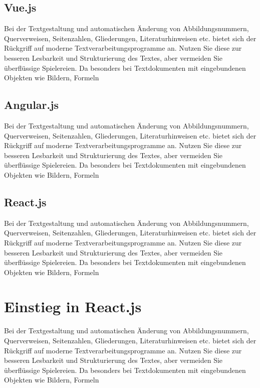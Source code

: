\subsection{Vue.js}
Bei der Textgestaltung und automatischen Änderung von Abbildungsnummern, Querverweisen,
Seitenzahlen, Gliederungen, Literaturhinweisen etc. bietet sich der Rückgriff
auf moderne Textverarbeitungsprogramme an. Nutzen Sie diese zur besseren Lesbarkeit
und Strukturierung des Textes, aber vermeiden Sie überflüssige Spielereien. Da
besonders bei Textdokumenten mit eingebundenen Objekten wie Bildern, Formeln

\subsection{Angular.js}
Bei der Textgestaltung und automatischen Änderung von Abbildungsnummern, Querverweisen,
Seitenzahlen, Gliederungen, Literaturhinweisen etc. bietet sich der Rückgriff
auf moderne Textverarbeitungsprogramme an. Nutzen Sie diese zur besseren Lesbarkeit
und Strukturierung des Textes, aber vermeiden Sie überflüssige Spielereien. Da
besonders bei Textdokumenten mit eingebundenen Objekten wie Bildern, Formeln

\subsection{React.js}
Bei der Textgestaltung und automatischen Änderung von Abbildungsnummern, Querverweisen,
Seitenzahlen, Gliederungen, Literaturhinweisen etc. bietet sich der Rückgriff
auf moderne Textverarbeitungsprogramme an. Nutzen Sie diese zur besseren Lesbarkeit
und Strukturierung des Textes, aber vermeiden Sie überflüssige Spielereien. Da
besonders bei Textdokumenten mit eingebundenen Objekten wie Bildern, Formeln

\section{Einstieg in React.js}
Bei der Textgestaltung und automatischen Änderung von Abbildungsnummern, Querverweisen,
Seitenzahlen, Gliederungen, Literaturhinweisen etc. bietet sich der Rückgriff
auf moderne Textverarbeitungsprogramme an. Nutzen Sie diese zur besseren Lesbarkeit
und Strukturierung des Textes, aber vermeiden Sie überflüssige Spielereien. Da
besonders bei Textdokumenten mit eingebundenen Objekten wie Bildern, Formeln

